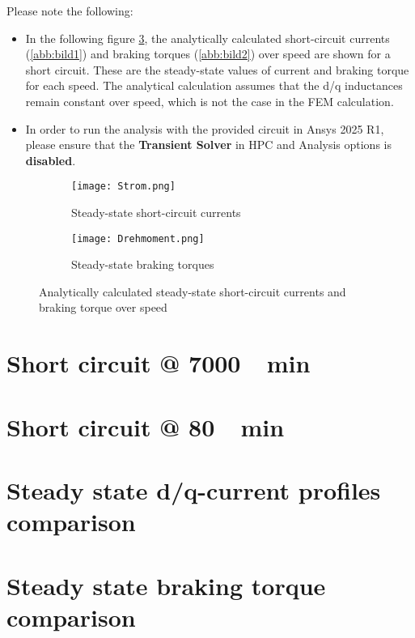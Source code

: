Please note the following:

\begin{itemize}
\item In the following figure \ref{abb:Kurzschluss}, the analytically calculated short-circuit currents (\autoref{abb:bild1}) and braking torques (\autoref{abb:bild2}) over speed are shown for a short circuit. These are the steady-state values of current and braking torque for each speed. The analytical calculation assumes that the d/q inductances remain constant over speed, which is not the case in the FEM calculation. 
\item In order to run the analysis with the provided circuit in Ansys 2025 R1, please ensure that the \textbf{Transient Solver} in HPC and Analysis options is \textbf{disabled}.
\end{itemize}

\begin{figure}
	\centering
	\begin{subfigure}[b]{0.85\textwidth} 
		\centering
		\texttt{[image: Strom.png]}
		\caption[Steady-state short-circuit currents]{\small Steady-state short-circuit currents}
		\label{abb:bild1}
	\end{subfigure}
	\hfill
	\begin{subfigure}[b]{0.85\textwidth}  
		\centering 
		\texttt{[image: Drehmoment.png]}
		\caption[Steady-state braking torques]{\small Steady-state braking torques}    
		\label{abb:bild2}
	\end{subfigure}
	\caption{Analytically calculated steady-state short-circuit currents and braking torque over speed}
	\label{abb:Kurzschluss}
\end{figure}

\newpage

\section{Short circuit @ \SI{7000}{\per\minute}}

\section{Short circuit @ \SI{80}{\per\minute}}

\section{Steady state d/q-current profiles comparison}

\section{Steady state braking torque comparison}

\newpage